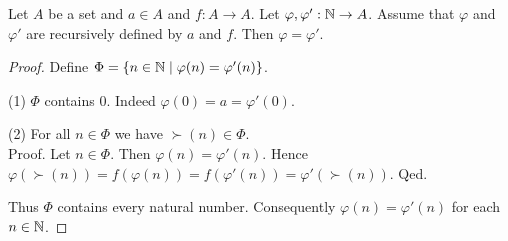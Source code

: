\documentclass[10pt]{article}
\begin{document}
  \begin{forthel}
    \begin{proposition}
      Let $A$ be a set and $a \in A$ and $f : A \to A$.
      Let $\varphi, \varphi' : \mathbb{N} \to A$.
      Assume that $\varphi$ and $\varphi'$ are recursively defined by $a$ and
      $f$.
      Then $\varphi = \varphi'$.
    \end{proposition}
    \begin{proof}
      Define $\Phi = \{ n \in \mathbb{N} \mid \varphi(n) = \varphi'(n) \}$.

      (1) $\Phi$ contains $0$.
      Indeed $\varphi(0) = a = \varphi'(0)$.

      (2) For all $n \in \Phi$ we have $\succ(n) \in \Phi$. \\
      Proof.
        Let $n \in \Phi$.
        Then $\varphi(n) = \varphi'(n)$.
        Hence $\varphi(\succ(n))
          = f(\varphi(n))
          = f(\varphi'(n))
          = \varphi'(\succ(n))$.
      Qed.

      Thus $\Phi$ contains every natural number.
      Consequently $\varphi(n) = \varphi'(n)$ for each $n \in \mathbb{N}$.
    \end{proof}
  \end{forthel}
\end{document}
